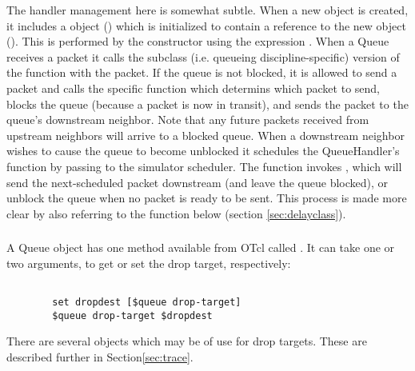 The handler management here is somewhat subtle.
When a new  object is created,
it includes a  object ()
which is initialized to contain a reference to the new  object
().
This is performed by the  constructor using the expression
.
When a Queue receives a packet it calls the subclass
(i.e. queueing discipline-specific) version of
the  function with the packet.
If the queue is not blocked, it is allowed to send a packet and
calls the specific  function which determins which
packet to send, blocks the queue (because a packet is now in transit), and
sends the packet to the queue's downstream neighbor.
Note that any future packets received from upstream neighbors
will arrive to a blocked queue.
When a downstream neighbor wishes to cause the queue to become unblocked
it schedules the QueueHandler's  function by
passing  to the simulator scheduler.
The  function invokes , which
will send the next-scheduled packet downstream (and leave the queue blocked),
or unblock the queue when no packet is ready to be sent.
This process is made more clear by also referring to the
 function below (section \ref{sec:delayclass}).

\subsubsection{}

A Queue object has one method available from OTcl
called .
It can take one or two arguments, to get or set the drop target, respectively:
\begin{small}
\begin{verbatim}

        set dropdest [$queue drop-target]
        $queue drop-target $dropdest
\end{verbatim}
\end{small}

There are several objects which may be of use for drop targets.
These are described further in Section\ref{sec:trace}.

\subsection{}

